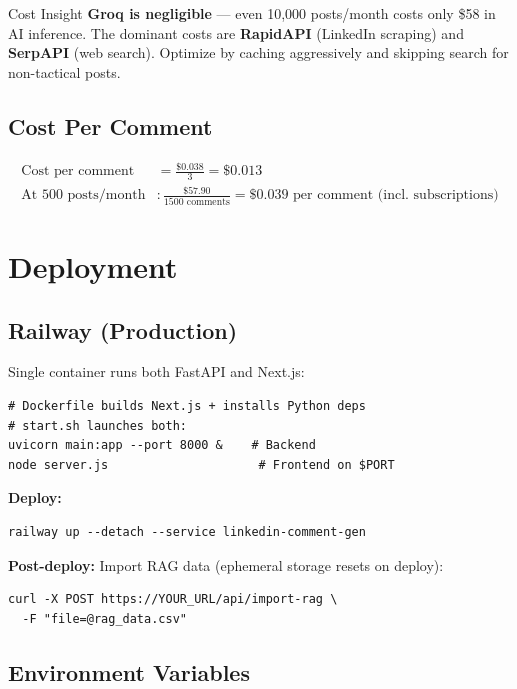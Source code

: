 \documentclass[12pt,a4paper]{article}
\begin{document}
\begin{archbox}{Cost Insight}
\textbf{Groq is negligible} --- even 10,000 posts/month costs only \$58 in AI inference. The dominant costs are \textbf{RapidAPI} (LinkedIn scraping) and \textbf{SerpAPI} (web search). Optimize by caching aggressively and skipping search for non-tactical posts.
\end{archbox}

\subsection{Cost Per Comment}

\begin{align*}
    \text{Cost per comment} &= \frac{\$0.038}{3} = \$0.013 \\
    \text{At 500 posts/month} &: \frac{\$57.90}{1500 \text{ comments}} = \$0.039 \text{ per comment (incl. subscriptions)}
\end{align*}

\section{Deployment}

\subsection{Railway (Production)}

Single container runs both FastAPI and Next.js:

\begin{lstlisting}
# Dockerfile builds Next.js + installs Python deps
# start.sh launches both:
uvicorn main:app --port 8000 &    # Backend
node server.js                     # Frontend on $PORT
\end{lstlisting}

\textbf{Deploy:}
\begin{lstlisting}
railway up --detach --service linkedin-comment-gen
\end{lstlisting}

\textbf{Post-deploy:} Import RAG data (ephemeral storage resets on deploy):
\begin{lstlisting}
curl -X POST https://YOUR_URL/api/import-rag \
  -F "file=@rag_data.csv"
\end{lstlisting}

\subsection{Environment Variables}
\end{document}
